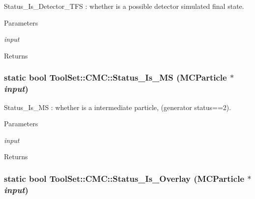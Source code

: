 Status\_\-Is\_\-Detector\_\-TFS : whether is a possible detector simulated final state. 
\begin{DoxyParams}{Parameters}
\item[{\em input}]\end{DoxyParams}
\begin{DoxyReturn}{Returns}

\end{DoxyReturn}
\hypertarget{classToolSet_1_1CMC_ae0ceba81f34f1a164b1d8ce719c92e05}{
\subsubsection[{Status\_\-Is\_\-MS}]{\setlength{\rightskip}{0pt plus 5cm}static bool ToolSet::CMC::Status\_\-Is\_\-MS (MCParticle $\ast$ {\em input})}}
\label{classToolSet_1_1CMC_ae0ceba81f34f1a164b1d8ce719c92e05}


Status\_\-Is\_\-MS : whether is a intermediate particle, (generator status==2). 
\begin{DoxyParams}{Parameters}
\item[{\em input}]\end{DoxyParams}
\begin{DoxyReturn}{Returns}

\end{DoxyReturn}
\hypertarget{classToolSet_1_1CMC_a9d3659a1fd4bad33a54c08769902e998}{
\subsubsection[{Status\_\-Is\_\-Overlay}]{\setlength{\rightskip}{0pt plus 5cm}static bool ToolSet::CMC::Status\_\-Is\_\-Overlay (MCParticle $\ast$ {\em input})}}
\label{classToolSet_1_1CMC_a9d3659a1fd4bad33a54c08769902e998}


